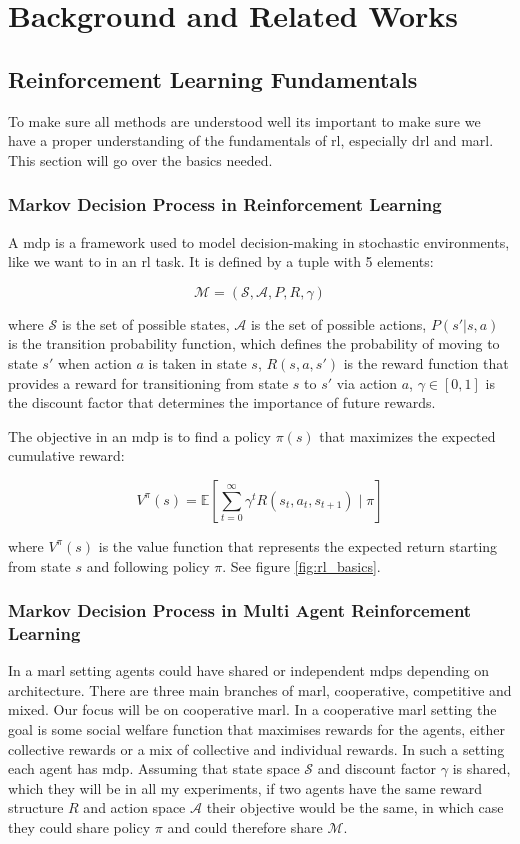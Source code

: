 \documentclass[UKenglish]{uiomasterthesis}
\begin{document}
\medskip
\chapter{Background and Related Works}

\section{Reinforcement Learning Fundamentals}
To make sure all methods are understood well its important to make sure we have a proper understanding of the fundamentals of \ac{rl}, especially \ac{drl} and \ac{marl}. This section will go over the basics needed.


\subsection{Markov Decision Process in Reinforcement Learning}

A \ac{mdp} is a framework used to model decision-making in stochastic environments, like we want to in an \ac{rl} task. It is defined by a tuple with 5 elements:

\[
\mathcal{M} = (\mathcal{S}, \mathcal{A}, P, R, \gamma)
\]

where \(\mathcal{S}\) is the set of possible states, \(\mathcal{A}\) is the set of possible actions, \(P(s' | s, a)\) is the transition probability function, which defines the probability of moving to state \(s'\) when action \(a\) is taken in state \(s\), \(R(s, a, s')\) is the reward function that provides a reward for transitioning from state \(s\) to \(s'\) via action \(a\), \(\gamma \in [0,1]\) is the discount factor that determines the importance of future rewards.

The objective in an \ac{mdp} is to find a policy \(\pi(s)\) that maximizes the expected cumulative reward:

\[
V^\pi(s) = \mathbb{E} \left[ \sum_{t=0}^{\infty} \gamma^t R(s_t, a_t, s_{t+1}) \mid \pi \right]
\]

where \(V^\pi(s)\) is the value function that represents the expected return starting from state \(s\) and following policy \(\pi\). See figure \ref{fig:rl_basics}.


\subsection{Markov Decision Process in Multi Agent Reinforcement Learning}
In a \ac{marl} setting agents could have shared or independent \acp{mdp} depending on architecture. There are three main branches of \ac{marl}, cooperative, competitive and mixed. Our focus will be on cooperative \ac{marl}.
In a cooperative \ac{marl} setting the goal is some social welfare function that maximises rewards for the agents, either collective rewards or a mix of collective and individual rewards. In such a setting each agent has \ac{mdp}. Assuming that state space \(\mathcal{S}\) and discount factor \(\gamma\) is shared, which they will be in all my experiments, if two agents have the same reward structure $R$ and action space \(\mathcal{A}\) their objective would be the same, in which case they could share policy \(\pi\) and could therefore share \(\mathcal{M}\).
\end{document}
